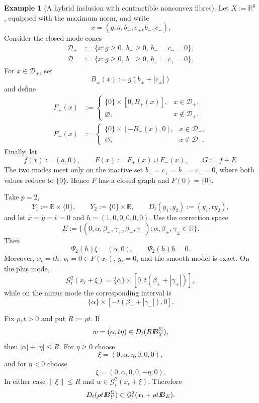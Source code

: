 \documentclass[11pt]{amsart}
\theoremstyle{definition}
\newtheorem{example}[theorem]{Example}
\theoremstyle{remark}
\newcommand{\bx}{\bar x}
\newcommand{\by}{\bar y}
\newcommand{\bv}{\bar v}
\def\ball{{I\kern -.35em B}}
\begin{document}
	
	\begin{example}[A hybrid inclusion with contractible nonconvex fibres]
		\label{ex:hybrid-contractible-fibres}
		Let $X:=\mathbb R^6$, equipped with the maximum norm, and write
		$$
		x=(g,a,b_+,c_+,b_-,c_-).
		$$
		Consider the closed mode cones
		$$
		\begin{aligned}
			\mathcal D_+
			&:=\{x:g\ge0,\ b_+\ge0,\ b_-=c_-=0\},\\
			\mathcal D_-
			&:=\{x:g\ge0,\ b_-\ge0,\ b_+=c_+=0\}.
		\end{aligned}
		$$
		For $x\in\mathcal D_\pm$, set
		$$
		B_\pm(x):=g(b_\pm+|c_\pm|)
		$$
		and define
		$$
		\begin{aligned}
			F_+(x)&:=
			\begin{cases}
				\{0\}\times[0,B_+(x)],&x\in\mathcal D_+,\\
				\varnothing,&x\notin\mathcal D_+,
			\end{cases}\\
			F_-(x)&:=
			\begin{cases}
				\{0\}\times[-B_-(x),0],&x\in\mathcal D_-,\\
				\varnothing,&x\notin\mathcal D_-.
			\end{cases}
		\end{aligned}
		$$
		Finally, let
		$$
		f(x):=(a,0),
		\qquad
		F(x):=F_+(x)\cup F_-(x),
		\qquad
		G:=f+F.
		$$
		The two modes meet only on the inactive set
		$b_+=c_+=b_-=c_-=0$, where both values reduce to $\{0\}$. Hence $F$
		has a closed graph and $F(0)=\{0\}$.
		
		Take $p=2$,
		$$
		Y_1:=\mathbb R\times\{0\},
		\qquad
		Y_2:=\{0\}\times\mathbb R,
		\qquad
		D_t(y_1,y_2):=(y_1,ty_2),
		$$
		and let $\bx=\by=\bv=0$ and $h=(1,0,0,0,0,0)$. Use the correction
		space
		$$
		E:=\{(0,\alpha,\beta_+,\gamma_+,\beta_-,\gamma_-):
		\alpha,\beta_\pm,\gamma_\pm\in\mathbb R\}.
		$$
		Then
		$$
		\Psi_2(h)\xi=(\alpha,0),
		\qquad
		\Psi_2(h)h=0.
		$$
		Moreover, $x_t=th$, $v_t=0\in F(x_t)$, $y_t=0$, and the smooth model is
		exact. On the plus mode,
		$$
		\mathcal G_t^2(x_t+\xi)
		=
		\{\alpha\}\times[0,t(\beta_++|\gamma_+|)],
		$$
		while on the minus mode the corresponding interval is
		$$
		\{\alpha\}\times[-t(\beta_-+|\gamma_-|),0].
		$$
		
		Fix $\rho,t>0$ and put $R:=\rho t$. If
		$$
		w=(\alpha,t\eta)\in D_t(R\ball_Y^\Sigma),
		$$
		then $|\alpha|+|\eta|\le R$. For $\eta\ge0$ choose
		$$
		\xi=(0,\alpha,\eta,0,0,0),
		$$
		and for $\eta<0$ choose
		$$
		\xi=(0,\alpha,0,0,-\eta,0).
		$$
		In either case $\|\xi\|\le R$ and
		$w\in\mathcal G_t^2(x_t+\xi)$. Therefore
		$$
		D_t(\rho t\ball_Y^\Sigma)
		\subset
		\mathcal G_t^2(x_t+\rho t\ball_E).
		$$
		

\end{example}
\end{document}
